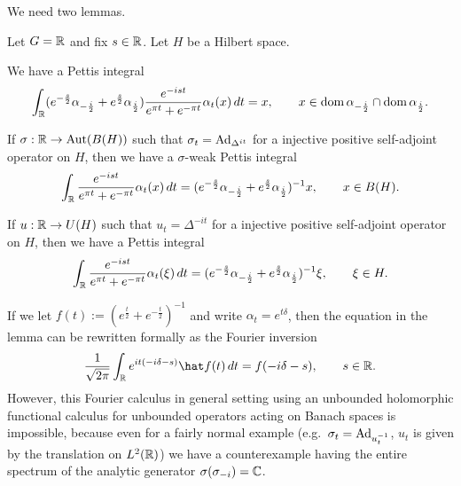 \documentclass{../../small}
\begin{document}
We need two lemmas.

\begin{lem}
Let $G=\mathbb{R}$ and fix $s\in\mathbb{R}$.
Let $H$ be a Hilbert space.
\begin{parts}
\item We have a Pettis integral
\[\int_{\mathbb{R}}(e^{-\frac s2}\alpha_{-\frac i2}+e^{\frac s2}\alpha_{\frac i2})\frac{e^{-ist}}{e^{\pi t}+e^{-\pi t}}\alpha_t(x)\,dt
=x,\qquad x\in\operatorname{dom}\alpha_{-\frac i2}\cap\operatorname{dom}\alpha_{\frac i2}.\]
\item If $\sigma:\mathbb{R}\to\operatorname{Aut}(B(H))$ such that $\sigma_t=\operatorname{Ad}_{\Delta^{it}}$ for a injective positive self-adjoint operator on $H$, then we have a $\sigma$-weak Pettis integral
\[\int_{\mathbb{R}}\frac{e^{-ist}}{e^{\pi t}+e^{-\pi t}}\alpha_t(x)\,dt
=(e^{-\frac s2}\alpha_{-\frac i2}+e^{\frac s2}\alpha_{\frac i2})^{-1}x,\qquad x\in B(H).\]
\item If $u:\mathbb{R}\to U(H)$ such that $u_t=\Delta^{-it}$ for a injective positive self-adjoint operator on $H$, then we have a Pettis integral
\[\int_{\mathbb{R}}\frac{e^{-ist}}{e^{\pi t}+e^{-\pi t}}\alpha_t(\xi)\,dt
=(e^{-\frac s2}\alpha_{-\frac i2}+e^{\frac s2}\alpha_{\frac i2})^{-1}\xi,\qquad \xi\in H.\]
\end{parts}
\end{lem}
\begin{rmk*}
If we let $f(t):=(e^{\frac t2}+e^{-\frac t2})^{-1}$ and write $\alpha_t=e^{t\delta}$, then the equation in the lemma can be rewritten formally as the Fourier inversion
\[\frac1{\sqrt{2\pi}}\int_\R e^{it(-i\delta-s)}\hat f(t)\,dt=f(-i\delta-s),\qquad s\in\R.\]
However, this Fourier calculus in general setting using an unbounded holomorphic functional calculus for unbounded operators acting on Banach spaces is impossible, because even for a fairly normal example (e.g.~$\sigma_t=\operatorname{Ad}_{u_t^{-1}}$, $u_t$ is given by the translation on $L^2(\mathbb{R})$) we have a counterexample having the entire spectrum of the analytic generator $\sigma(\sigma_{-i})=\mathbb{C}$.
\end{rmk*}
\end{document}
